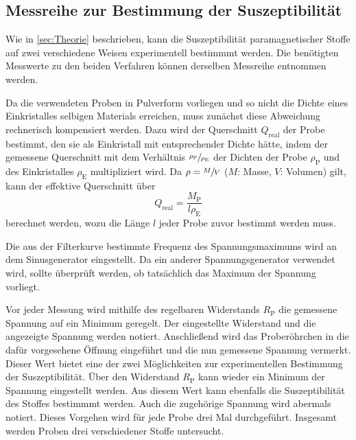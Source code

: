\subsection{Messreihe zur Bestimmung der Suszeptibilität}
\label{subsec:D_Suszeptibilität}
Wie in \autoref{sec:Theorie} beschrieben, kann die Suszeptibilität paramagnetischer Stoffe auf zwei verschiedene Weisen experimentell bestimmmt werden. 
Die benötigten Messwerte zu den beiden Verfahren können derselben Messreihe entnommen werden. 

Da die verwendeten Proben in Pulverform vorliegen und so nicht die Dichte eines Einkristalles selbigen Materials erreichen, muss zunächst diese Abweichung
rechnerisch kompensiert werden. Dazu wird der Querschnitt $Q_\text{real}$ der Probe bestimmt, den sie als Einkristall mit entsprechender Dichte hätte,
indem der gemessene Querschnitt mit dem Verhältnis $\sfrac{\rho_\text{P}}{\rho_\text{E}}$ der Dichten der Probe $\rho_\text{P}$ und des Einkristalles $\rho_\text{E}$ 
multipliziert wird. Da $\rho = \sfrac{M}{V}$ ($M$: Masse, $V$: Volumen) gilt, kann der effektive Querschnitt über
\begin{equation}
    \label{eqn:Q_real}
    Q_\text{real} = \frac{M_\text{P}}{l \rho_\text{E}}
\end{equation}
berechnet werden, wozu die Länge $l$ jeder Probe zuvor bestimmt werden muss. 

Die aus der Filterkurve bestimmte Frequenz des Spannungsmaximums wird an dem Sinusgenerator eingestellt. Da ein anderer Spannungsgenerator verwendet wird, sollte 
überprüft werden, ob tatsächlich das Maximum der Spannung vorliegt.

Vor jeder Messung wird mithilfe des regelbaren Widerstands $R_\text{P}$ die gemessene Spannung auf ein Minimum geregelt. Der eingestellte Widerstand und die angezeigte 
Spannung werden notiert. Anschließend wird das Proberöhrchen in die dafür vorgesehene Öffnung eingeführt und die nun gemessene Spannung vermerkt. 
Dieser Wert bietet eine der zwei Möglichkeiten zur experimentellen Bestimmung der Suszeptibilität. Über den Widerstand $R_\text{P}$ kann wieder ein Minimum der Spannung
eingestellt werden. Aus diesem Wert kann ebenfalls die Suszeptibilität des Stoffes bestimmmt werden. Auch die zugehörige Spannung wird abermals notiert.
Dieses Vorgehen wird für jede Probe drei Mal durchgeführt. Insgesamt werden Proben drei verschiedener Stoffe untersucht.  
